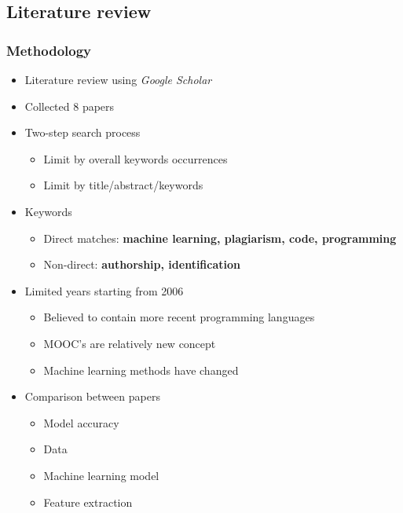 \documentclass[t,12pt,pdftex]{beamer}
\begin{document}
\subsection{Literature review}


\begin{frame}
	\frametitle{Methodology}
	\begin{itemize}
		\item Literature review using \textit{Google Scholar}
		\item Collected 8 papers 
		\item Two-step search process
		\begin{itemize}
			\item Limit by overall keywords occurrences
			\item Limit by title/abstract/keywords
		\end{itemize}
		\item Keywords
		\begin{itemize}
			\item Direct matches: \textbf{machine learning, plagiarism, code, programming}
			\item Non-direct: \textbf{authorship, identification} 
		\end{itemize}
	\end{itemize}
\end{frame}

\begin{frame}
	\vspace{1in}
	\begin{itemize}
		\item Limited years starting from 2006
		\begin{itemize}
			\item Believed to contain more recent programming languages
			\item MOOC's are relatively new concept
			\item Machine learning methods have changed
		\end{itemize}
		\item Comparison between papers
		\begin{itemize}
			\item Model accuracy
			\item Data
			\item Machine learning model
			\item Feature extraction
		\end{itemize}
	\end{itemize}
\end{frame}
\end{document}
